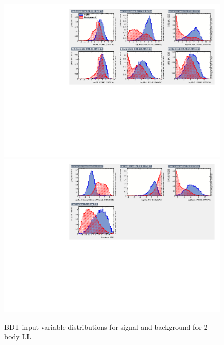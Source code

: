 \begin{figure}[tb]
\includegraphics[width=\linewidth]{figures/selection/inputvariables_KPi_LL_run1_1.pdf}
\includegraphics[width=\linewidth]{figures/selection/inputvariables_KPi_LL_run1_2.pdf}
\caption{BDT input variable distributions for signal and background for 2-body LL}
\label{BDTinputdist2bodyLL}
\end{figure}

